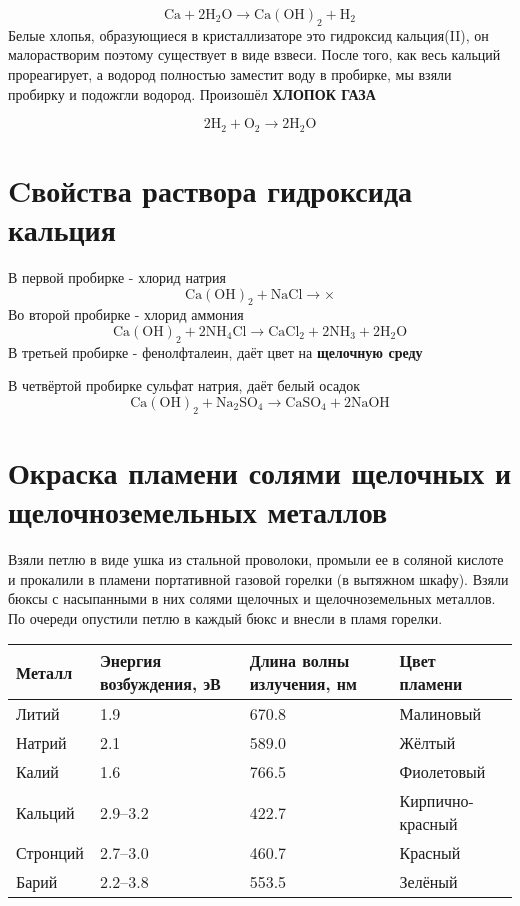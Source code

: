 \documentclass[a4paper,12pt]{article}
\begin{document}
\begin{equation} 
\mathrm{Ca + 2H_2O \longrightarrow Ca(OH)_2 + H_2 } 
\end{equation}
Белые хлопья,
образующиеся в кристаллизаторе это гидроксид кальция(II), он малорастворим поэтому существует в виде взвеси. После того, как весь кальций прореагирует, а водород полностью заместит воду в пробирке, мы взяли пробирку и подожгли водород. Произошёл \textbf{ХЛОПОК ГАЗА}

\begin{equation} 
\mathrm{2H_2 + O_2 \longrightarrow 2H_2O } 
\end{equation}
\section{Cвойства раствора гидроксида кальция}
В первой пробирке - хлорид натрия
\begin{equation} 
\mathrm{Ca(OH)_2 + NaCl \longrightarrow \times } 
\end{equation}
Во второй пробирке - хлорид аммония
\begin{equation} 
\mathrm{Ca(OH)_2 + 2NH_4Cl \longrightarrow CaCl_2 + 2NH_3 + 2H_2O } 
\end{equation}
В третьей пробирке - фенолфталеин, даёт цвет на \textbf{щелочную среду}


В четвёртой пробирке сульфат натрия, даёт белый осадок
\begin{equation} 
\mathrm{Ca(OH)_2 + Na_2SO_4 \longrightarrow CaSO_4 + 2NaOH } 
\end{equation}
\section{Окраска пламени солями щелочных и щелочноземельных металлов}
Взяли петлю в виде ушка из стальной проволоки, промыли ее в соляной кислоте и
прокалили в пламени портативной газовой горелки (в вытяжном шкафу). Взяли бюксы с
насыпанными в них солями щелочных и щелочноземельных металлов. По очереди опустили
петлю в каждый бюкс и внесли в пламя горелки.
\begin{table}[!ht]
    \centering
    \begin{tabular}{|l|l|l|l}
    \hline
        Металл & Энергия возбуждения, эВ & Длина волны излучения, нм &  Цвет пламени\\ \hline
        Литий & 1.9 & 670.8&   Малиновый \\ \hline
        Натрий & 2.1 & 589.0&  Жёлтый \\ \hline
        Калий & 1.6 & 766.5& Фиолетовый\\ \hline
        Кальций & 2.9–3.2 & 422.7& Кирпично-красный \\ \hline
        Стронций & 2.7–3.0 & 460.7& Красный \\ \hline
        Барий & 2.2–3.8 & 553.5& Зелёный \\ \hline
    \end{tabular}
\end{table}
\end{document}
